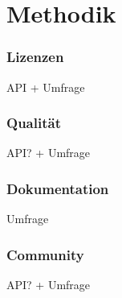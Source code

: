\chapter{Methodik}

\subsection{Lizenzen}
API + Umfrage 

\subsection{Qualität}
API? + Umfrage

\subsection{Dokumentation}
Umfrage

\subsection{Community}
API? + Umfrage